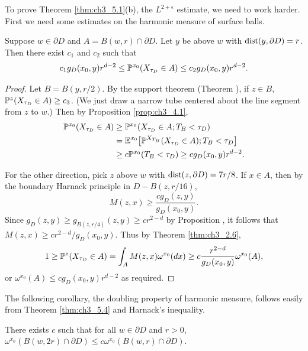 
To prove Theorem \ref{thm:ch3_5.1}(b), the $L^{2+\epsilon}$ estimate, we need to work harder. First we need some estimates on the harmonic measure of surface balls.

\begin{theorem}\label{thm:ch3_5.4}
Suppose $w \in \partial D$ and $A = B(w,r) \cap \partial D$. Let $y$ be above $w$ with $\dist(y,\partial D) = r$. Then there exist $c_1$ and $c_2$ such that
\mpagebreak
\[
    c_1g_D(x_0,y)r^{d-2} \leq \P^{x_0}(X_{\tau_D} \in A) \leq c_2g_D(x_0,y)r^{d-2}.
\]
\end{theorem}

\begin{proof}
Let $B = B(y,r/2)$. By the support theorem (Theorem ), if $z \in B$, $\P^z(X_{\tau_D} \in A) \geq c_3$. (We just draw a narrow tube centered about the line segment from $z$ to $w$.) Then by Proposition \ref{prop:ch3_4.1},
\begin{align*}
    \P^{x_0}(X_{\tau_D} \in A) &\geq \P^{x_0}(X_{\tau_D} \in A; T_B < \tau_D) \\
    &= \E^{x_0}\big[\P^{X_{T_B}}(X_{\tau_D} \in A); T_B < \tau_D\big] \\
    &\geq c\P^{x_0}(T_B < \tau_D) \geq cg_D(x_0,y)r^{d-2}.
\end{align*}

For the other direction, pick $z$ above $w$ with $\dist(z,\partial D) = 7r/8$. If $x \in A$, then by the boundary Harnack principle in $D - B(z,r/16)$,
\[
    M(z,x) \geq \frac{cg_D(z,y)}{g_D(x_0,y)}.
\]
Since $g_D(z,y) \geq g_{B(z,r/4)}(z,y) \geq cr^{2-d}$ by Proposition , it follows that $M(z,x) \geq cr^{2-d}/g_D(x_0,y)$. Thus by Theorem \ref{thm:ch3_2.6},
\[
    1 \geq \P^z(X_{\tau_D} \in A) = \int_A M(z,x)\omega^{x_0}(dx) \geq c\frac{r^{2-d}}{g_D(x_0,y)}\omega^{x_0}(A),
\]
or $\omega^{x_0}(A) \leq cg_D(x_0,y)r^{d-2}$ as required.
\end{proof}

The following corollary, the doubling property of harmonic measure, follows easily from Theorem \ref{thm:ch3_5.4} and Harnack's inequality.

\begin{corollary}\label{cor:ch3_5.5}
There exists $c$ such that for all $w \in \partial D$ and $r > 0$, $\omega^{x_0}(B(w,2r) \cap \partial D) \leq c\omega^{x_0}(B(w,r) \cap \partial D)$.
\end{corollary}

